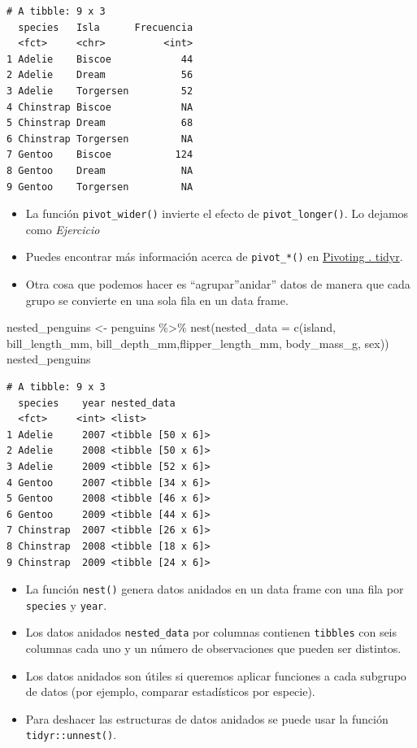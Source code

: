 \documentclass[
  letterpaper,
  DIV=11,
  numbers=noendperiod]{scrreprt}
\newenvironment{Shaded}{\begin{snugshade}}{\end{snugshade}}
\newcommand{\AttributeTok}[1]{\textcolor[rgb]{0.40,0.45,0.13}{#1}}
\newcommand{\FunctionTok}[1]{\textcolor[rgb]{0.28,0.35,0.67}{#1}}
\newcommand{\NormalTok}[1]{\textcolor[rgb]{0.00,0.23,0.31}{#1}}
\newcommand{\OtherTok}[1]{\textcolor[rgb]{0.00,0.23,0.31}{#1}}
\newcommand{\SpecialCharTok}[1]{\textcolor[rgb]{0.37,0.37,0.37}{#1}}
\begin{document}
\begin{verbatim}
# A tibble: 9 x 3
  species   Isla      Frecuencia
  <fct>     <chr>          <int>
1 Adelie    Biscoe            44
2 Adelie    Dream             56
3 Adelie    Torgersen         52
4 Chinstrap Biscoe            NA
5 Chinstrap Dream             68
6 Chinstrap Torgersen         NA
7 Gentoo    Biscoe           124
8 Gentoo    Dream             NA
9 Gentoo    Torgersen         NA
\end{verbatim}

\begin{itemize}
\item
  La función \texttt{pivot\_wider()} invierte el efecto de
  \texttt{pivot\_longer()}. Lo dejamos como {\emph{Ejercicio}}
\item
  Puedes encontrar más información acerca de \texttt{pivot\_*()} en
  \href{https://tidyr.tidyverse.org/articles/pivot.html}{Pivoting .
  tidyr}.
\item
  Otra cosa que podemos hacer es ``agrupar''anidar'' datos de manera que
  cada grupo se convierte en una sola fila en un data frame.
\end{itemize}

\begin{Shaded}
\begin{Highlighting}[]
\NormalTok{nested\_penguins }\OtherTok{\textless{}{-}}\NormalTok{ penguins }\SpecialCharTok{\%\textgreater{}\%} 
    \FunctionTok{nest}\NormalTok{(}\AttributeTok{nested\_data =} 
           \FunctionTok{c}\NormalTok{(island, bill\_length\_mm, }
\NormalTok{             bill\_depth\_mm,flipper\_length\_mm,}
\NormalTok{             body\_mass\_g, sex))}
\NormalTok{nested\_penguins}
\end{Highlighting}
\end{Shaded}

\begin{verbatim}
# A tibble: 9 x 3
  species    year nested_data      
  <fct>     <int> <list>           
1 Adelie     2007 <tibble [50 x 6]>
2 Adelie     2008 <tibble [50 x 6]>
3 Adelie     2009 <tibble [52 x 6]>
4 Gentoo     2007 <tibble [34 x 6]>
5 Gentoo     2008 <tibble [46 x 6]>
6 Gentoo     2009 <tibble [44 x 6]>
7 Chinstrap  2007 <tibble [26 x 6]>
8 Chinstrap  2008 <tibble [18 x 6]>
9 Chinstrap  2009 <tibble [24 x 6]>
\end{verbatim}

\begin{itemize}
\item
  La función \texttt{nest()} genera datos anidados en un data frame con
  una fila por \texttt{species} y \texttt{year}.
\item
  Los datos anidados \texttt{nested\_data} por columnas contienen
  \texttt{tibbles} con seis columnas cada uno y un número de
  observaciones que pueden ser distintos.
\item
  Los datos anidados son útiles si queremos aplicar funciones a cada
  subgrupo de datos (por ejemplo, comparar estadísticos por especie).
\item
  Para deshacer las estructuras de datos anidados se puede usar la
  función \texttt{tidyr::unnest()}.
\end{itemize}
\end{document}
